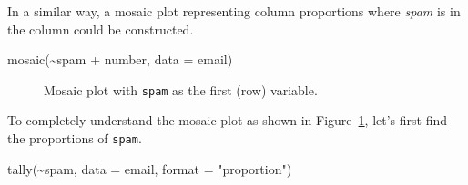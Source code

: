 \documentclass[
  letterpaper,
  DIV=11,
  numbers=noendperiod]{scrreprt}
\newenvironment{Shaded}{\begin{snugshade}}{\end{snugshade}}
\newcommand{\AttributeTok}[1]{\textcolor[rgb]{0.40,0.45,0.13}{#1}}
\newcommand{\FunctionTok}[1]{\textcolor[rgb]{0.28,0.35,0.67}{#1}}
\newcommand{\NormalTok}[1]{\textcolor[rgb]{0.00,0.23,0.31}{#1}}
\newcommand{\SpecialCharTok}[1]{\textcolor[rgb]{0.37,0.37,0.37}{#1}}
\newcommand{\StringTok}[1]{\textcolor[rgb]{0.13,0.47,0.30}{#1}}
\begin{document}
In a similar way, a mosaic plot representing column proportions where
\emph{spam} is in the column could be constructed.

\begin{Shaded}
\begin{Highlighting}[]
\FunctionTok{mosaic}\NormalTok{(}\SpecialCharTok{\textasciitilde{}}\NormalTok{spam }\SpecialCharTok{+}\NormalTok{ number, }\AttributeTok{data =}\NormalTok{ email)}
\end{Highlighting}
\end{Shaded}

\begin{figure}[H]


\caption{\label{fig-mosaic63}Mosaic plot with \texttt{spam} as the first
(row) variable.}

\end{figure}%

To completely understand the mosaic plot as shown in
Figure~\ref{fig-mosaic63}, let's first find the proportions of
\texttt{spam}.

\begin{Shaded}
\begin{Highlighting}[]
\FunctionTok{tally}\NormalTok{(}\SpecialCharTok{\textasciitilde{}}\NormalTok{spam, }\AttributeTok{data =}\NormalTok{ email, }\AttributeTok{format =} \StringTok{"proportion"}\NormalTok{)}
\end{Highlighting}
\end{Shaded}
\end{document}
